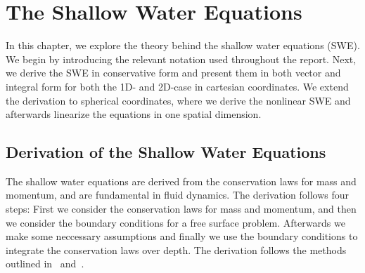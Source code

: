 \chapter{The Shallow Water Equations}\label{ch:theory}
In this chapter, we explore the theory behind the shallow water equations (SWE).
We begin by introducing the relevant notation used throughout the report.
Next, we derive the SWE in conservative form and present them in both vector and integral form for both the 1D- and 2D-case in cartesian coordinates.
We extend the derivation to spherical coordinates, where we derive the nonlinear SWE and afterwards linearize the equations in one spatial dimension.



\section{Derivation of the Shallow Water Equations}
The shallow water equations are derived from the conservation laws for mass and momentum, and are fundamental in fluid dynamics.
The derivation follows four steps: First we consider the conservation laws for mass and momentum, and then we consider the boundary conditions for a free surface problem.
Afterwards we make some neccessary assumptions and finally we use the boundary conditions to integrate the conservation laws over depth.
The derivation follows the methods outlined in~\cite{Toro2001-Shock} and~\cite{Vreugdenhil1994}.



